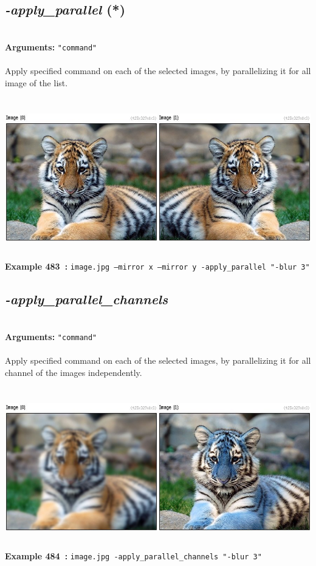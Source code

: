 \documentclass[a4paper,11pt,twoside]{book}
\begin{document}
\subsection{\emph{-apply\_parallel} (*)}\vspace*{-0.5em}
~\\\textbf{Arguments: } 
{\small \texttt{"command"}}\\~\\
Apply specified command on each of the selected images, by parallelizing it for all image of the list.
\begin{center}\includegraphics[keepaspectratio=true,height=7cm,width=\textwidth]{img/gmic_def483.jpg}\\
{\footnotesize \textbf{Example 483~:} \texttt{image.jpg --mirror x --mirror y -apply\_parallel "-blur 3"}}
\end{center}

\subsection{\emph{-apply\_parallel\_channels} }\vspace*{-0.5em}
~\\\textbf{Arguments: } 
{\small \texttt{"command"}}\\~\\
Apply specified command on each of the selected images, by parallelizing it for all channel of the images independently.
\begin{center}\includegraphics[keepaspectratio=true,height=7cm,width=\textwidth]{img/gmic_def484.jpg}\\
{\footnotesize \textbf{Example 484~:} \texttt{image.jpg -apply\_parallel\_channels "-blur 3"}}
\end{center}
\end{document}
